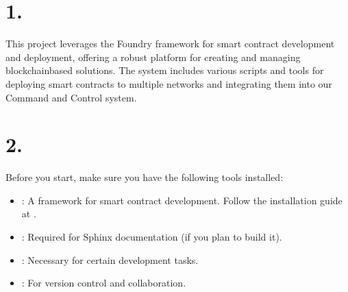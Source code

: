\documentclass[a4paper,10pt,english]{sphinxmanual}
\begin{document}
\section{1. }
\label{\detokenize{quickstart:introduction}}
\sphinxAtStartPar
This project leverages the Foundry framework for smart contract development and deployment, offering a robust platform for creating and managing blockchain\sphinxhyphen{}based solutions. The system includes various scripts and tools for deploying smart contracts to multiple networks and integrating them into our Command and Control system.


\section{2. }
\label{\detokenize{quickstart:prerequisites}}\label{\detokenize{quickstart:id1}}
\sphinxAtStartPar
Before you start, make sure you have the following tools installed:
\begin{itemize}
\item {} 
\sphinxAtStartPar
{}: A framework for smart contract development. Follow the installation guide at .

\item {} 
\sphinxAtStartPar
{}: Required for Sphinx documentation (if you plan to build it).

\item {} 
\sphinxAtStartPar
{}: Necessary for certain development tasks.

\item {} 
\sphinxAtStartPar
{}: For version control and collaboration.

\end{itemize}
\end{document}

